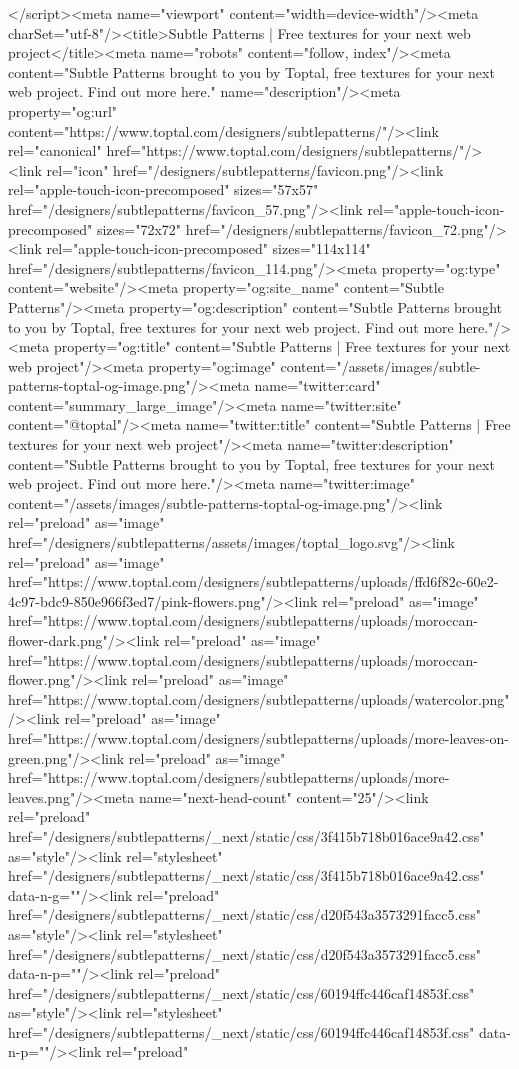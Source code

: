         </script><meta name="viewport" content="width=device-width"/><meta charSet="utf-8"/><title>Subtle Patterns | Free textures for your next web project</title><meta name="robots" content="follow, index"/><meta content="Subtle Patterns brought to you by Toptal, free textures for your next web project. Find out more here." name="description"/><meta property="og:url" content="https://www.toptal.com/designers/subtlepatterns/"/><link rel="canonical" href="https://www.toptal.com/designers/subtlepatterns/"/><link rel="icon" href="/designers/subtlepatterns/favicon.png"/><link rel="apple-touch-icon-precomposed" sizes="57x57" href="/designers/subtlepatterns/favicon_57.png"/><link rel="apple-touch-icon-precomposed" sizes="72x72" href="/designers/subtlepatterns/favicon_72.png"/><link rel="apple-touch-icon-precomposed" sizes="114x114" href="/designers/subtlepatterns/favicon_114.png"/><meta property="og:type" content="website"/><meta property="og:site_name" content="Subtle Patterns"/><meta property="og:description" content="Subtle Patterns brought to you by Toptal, free textures for your next web project. Find out more here."/><meta property="og:title" content="Subtle Patterns | Free textures for your next web project"/><meta property="og:image" content="/assets/images/subtle-patterns-toptal-og-image.png"/><meta name="twitter:card" content="summary_large_image"/><meta name="twitter:site" content="@toptal"/><meta name="twitter:title" content="Subtle Patterns | Free textures for your next web project"/><meta name="twitter:description" content="Subtle Patterns brought to you by Toptal, free textures for your next web project. Find out more here."/><meta name="twitter:image" content="/assets/images/subtle-patterns-toptal-og-image.png"/><link rel="preload" as="image" href="/designers/subtlepatterns/assets/images/toptal_logo.svg"/><link rel="preload" as="image" href="https://www.toptal.com/designers/subtlepatterns/uploads/ffd6f82c-60e2-4c97-bdc9-850e966f3ed7/pink-flowers.png"/><link rel="preload" as="image" href="https://www.toptal.com/designers/subtlepatterns/uploads/moroccan-flower-dark.png"/><link rel="preload" as="image" href="https://www.toptal.com/designers/subtlepatterns/uploads/moroccan-flower.png"/><link rel="preload" as="image" href="https://www.toptal.com/designers/subtlepatterns/uploads/watercolor.png"/><link rel="preload" as="image" href="https://www.toptal.com/designers/subtlepatterns/uploads/more-leaves-on-green.png"/><link rel="preload" as="image" href="https://www.toptal.com/designers/subtlepatterns/uploads/more-leaves.png"/><meta name="next-head-count" content="25"/><link rel="preload" href="/designers/subtlepatterns/_next/static/css/3f415b718b016ace9a42.css" as="style"/><link rel="stylesheet" href="/designers/subtlepatterns/_next/static/css/3f415b718b016ace9a42.css" data-n-g=""/><link rel="preload" href="/designers/subtlepatterns/_next/static/css/d20f543a3573291facc5.css" as="style"/><link rel="stylesheet" href="/designers/subtlepatterns/_next/static/css/d20f543a3573291facc5.css" data-n-p=""/><link rel="preload" href="/designers/subtlepatterns/_next/static/css/60194ffc446caf14853f.css" as="style"/><link rel="stylesheet" href="/designers/subtlepatterns/_next/static/css/60194ffc446caf14853f.css" data-n-p=""/><link rel="preload" 